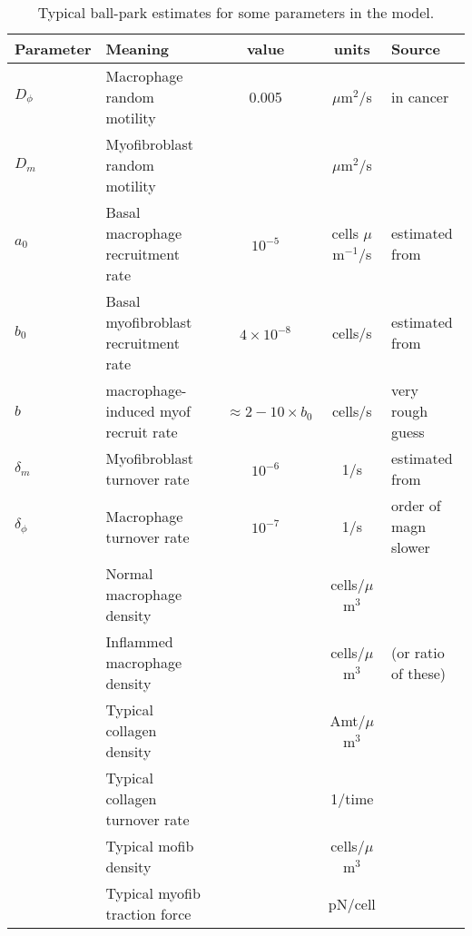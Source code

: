 \begin{table}[ht]
    \centering
    \begin{tabular}{|l|l|c|c|l|} \hline
     Parameter & Meaning &value &units & Source  \\ \hline
     
      $D_\phi$ & Macrophage random motility & 0.005 & $\mu$m$^2$/s &in cancer \cite{owen1997pattern,khajanchi2021spatiotemporal} \\
       $D_m$ & Myofibroblast random motility & & $\mu$m$^2$/s & \\
      
      $a_0$& Basal macrophage recruitment rate&$10^{-5}$& cells $\mu$m$^{-1}$/s& estimated from \cite{gupta2006spatiotemporal}\\
      
    $b_0$&Basal myofibroblast recruitment rate & $4 \times 10^{-8}$& cells/s& estimated from \cite{masur1996myofibroblasts,gascard2016carcinoma} \\
    $b$&macrophage-induced myof recruit rate& ~$\approx 2-10\times b_0$& cells/s&very rough guess\\

    
    $\delta_m$&Myofibroblast turnover rate& $10^{-6}$& 1/s& estimated from \cite{masur1996myofibroblasts}\\

    $\delta_\phi$&Macrophage turnover rate& $10^{-7}$&1/s& order of magn slower \cite{owen1997pattern}\\

    &Normal macrophage density & &cells/$\mu$m$^3$ &\\
 
      &Inflammed macrophage density & &cells/$\mu$m$^3$ &(or ratio of these)\\
      
      &Typical collagen density & 
        &Amt/$\mu$m$^3$& \\

    &Typical collagen turnover rate&
        & 1/time & \\
        
      &Typical mofib density& 
      &cells/$\mu$m$^3$ &\\
      
     &Typical myofib traction force& &pN/cell& \\   \hline
    \end{tabular}
    \caption{Typical ball-park estimates for some parameters in the model. }
    \label{tab:params}
\end{table}
